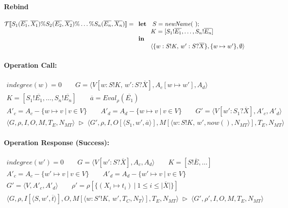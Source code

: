 \documentclass{llncs}
\newcommand{\sem}[1]{[ \! [ #1 ] \! ]}
\newcommand{\tuple}[1]{\langle #1 \rangle}
\newcommand{\trad}[1]{{\cal T}\sem{ #1 }}
\newcommand{\setof}[1]{\{ #1 \} }
\newcommand{\eval}[2]{\mathit{Eval}_{#1}(#2)}
\def\tr{\rhd}    %
\newcommand{\pfrule}[2]{\begin{array}{c} #1 \\ \hline #2 \end{array}}
\begin{document}
\paragraph{Rebind}

$$
\trad{S_1(\overline{E_1}, \overline{X_1}) \% S_2(\overline{E_2}, \overline{X_2}) \% \dots \% S_n(\overline{E_n}, \overline{X_n})}  =  \\
\begin{array}[t]{l}
\mathbf{let}\ \ \ S= \mathit{newName}(\ ) ; \\
   \qquad K = [S_1!\overline{E_1},\dots, S_n!\overline{E_n}]\\
\mathbf{in}\\
\qquad\tuple{\setof{w:S!K, \, w' : S?\overline{X}}, \setof{w \mapsto w'}, \emptyset}
\end{array}
$$

\paragraph{Operation Call:}

$$
\pfrule{
\mathit{indegree}(w) = 0 \qquad 
G = \tuple{V[w:S!K, \, w' : S?\overline{X}], A_c[w \mapsto w'], A_d} \\[1mm]
K = [S_1!\overline{E_1},\dots, S_n!\overline{E_n}] \qquad \overline{a} = \eval{\rho}{\overline{E_1}} \\[1mm]
A'_c = A_c - \setof{w\mapsto v \ | \ v \in V} \qquad
A'_d = A_d - \setof{w\mapsto v \ | \ v \in V} \qquad
G' = \tuple{V[w' : S_1?\overline{X}], A'_c, A'_d}
}{
\tuple{G,\rho, I, O, M, T_E, N_{MT}}
\; \tr \;
\tuple{G',\rho, I, O[\tuple{S_1, w', \overline{a}}], M[\tuple{w:S!K, \, w', \mathit{now()}, N_{MT}}], T_E, N_{MT}}
}
$$

\paragraph{Operation Response (Success):}
$$
\pfrule{
\mathit{indegree}(w') = 0 \qquad
G = \tuple{V[w' : S?\overline{X}], A_c, A_d} \qquad
K = [S!\overline{E},\dots] \\[1mm]
A'_c = A_c - \setof{w'\mapsto v \ | \ v \in V} \qquad
A'_d = A_d - \setof{w'\mapsto v \ | \ v \in V} \\[1mm]
G' = \tuple{V, A'_c, A'_d} \qquad
\rho' = \rho[\setof{(X_i\mapsto t_i) \ | \ 1 \leq i \leq |\overline{X}|}]
}{
\tuple{G,\rho, I[\tuple{S, w', \overline{t}}], O, M[\tuple{w:S'!K, \, w', T_C, N_{T}}], T_E, N_{MT}}
\; \tr \;
\tuple{G',\rho', I, O, M, T_E, N_{MT}}
}
$$
\end{document}
